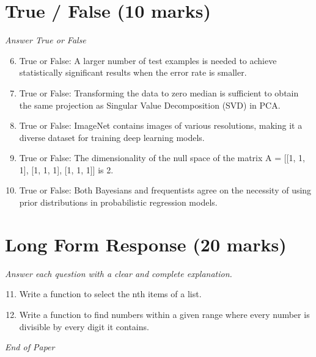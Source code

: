 \documentclass[12pt]{article}
\begin{document}
\section*{True / False (10 marks)}
\textit{Answer True or False}
\begin{enumerate}[label=\arabic*.]
\setcounter{enumi}{5}
\item True or False: A larger number of test examples is needed to achieve statistically significant results when the error rate is smaller.
\item True or False: Transforming the data to zero median is sufficient to obtain the same projection as Singular Value Decomposition (SVD) in PCA.
\item True or False: ImageNet contains images of various resolutions, making it a diverse dataset for training deep learning models.
\item True or False: The dimensionality of the null space of the matrix A = [[1, 1, 1], [1, 1, 1], [1, 1, 1]] is 2.
\item True or False: Both Bayesians and frequentists agree on the necessity of using prior distributions in probabilistic regression models.
\end{enumerate}

\section*{Long Form Response (20 marks)}
\textit{Answer each question with a clear and complete explanation.}
\begin{enumerate}[label=\arabic*.]
\setcounter{enumi}{10}
\item Write a function to select the nth items of a list.
\item Write a function to find numbers within a given range where every number is divisible by every digit it contains.
\end{enumerate}

\vfill
\noindent\textit{End of Paper}
\end{document}
